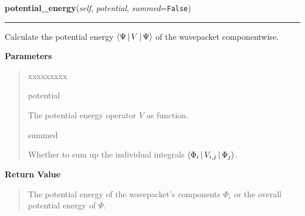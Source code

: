 \hspace{.8\funcindent}\begin{boxedminipage}{\funcwidth}

    \raggedright \textbf{potential\_energy}(\textit{self}, \textit{potential}, \textit{summed}={\tt False})

    \vspace{-1.5ex}

    \rule{\textwidth}{0.5\fboxrule}
\setlength{\parskip}{2ex}
    Calculate the potential energy
    $\Braket{\Psi|V|\Psi}$
    of the wavepacket componentwise.

\setlength{\parskip}{1ex}
      \textbf{Parameters}
      \vspace{-1ex}

      \begin{quote}
        \begin{Ventry}{xxxxxxxxx}

          \item[potential]

          The potential energy operator $V$ as function.

          \item[summed]

          Whether to sum up the individual integrals
          $\Braket{\Phi_i|V_{i,j}|\Phi_j}$.

        \end{Ventry}

      \end{quote}

      \textbf{Return Value}
    \vspace{-1ex}

      \begin{quote}
      The potential energy of the wavepacket's components
      $\Phi_i$ or the overall potential energy of
      $\Psi$.

      \end{quote}

    \end{boxedminipage}

    \label{HagedornWavepacket:HagedornWavepacket:kinetic_energy}

    \vspace{0.5ex}

